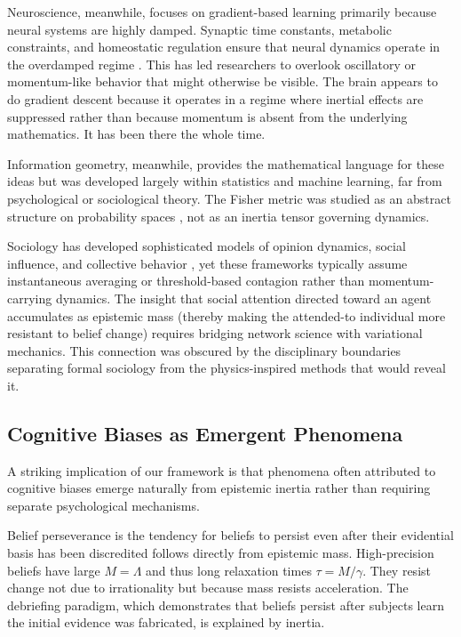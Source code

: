 \documentclass[12pt]{article}
\begin{document}
Neuroscience, meanwhile, focuses on gradient-based learning primarily because neural systems are highly damped. Synaptic time constants, metabolic constraints, and homeostatic regulation ensure that neural dynamics operate in the overdamped regime \citep{friston2008hierarchical} \citep{bogacz2017tutorial}. This has led researchers to overlook oscillatory or momentum-like behavior that might otherwise be visible. The brain appears to do gradient descent because it operates in a regime where inertial effects are suppressed rather than because momentum is absent from the underlying mathematics. It has been there the whole time.

Information geometry, meanwhile, provides the mathematical language for these ideas but was developed largely within statistics and machine learning, far from psychological or sociological theory. The Fisher metric was studied as an abstract structure on probability spaces \citep{Amari2016}, not as an inertia tensor governing dynamics.

 
Sociology has developed sophisticated models of opinion dynamics, social influence, and collective behavior \citep{degroot1974, friedkin2011, flache2017}, yet these frameworks typically assume instantaneous averaging or threshold-based contagion rather than momentum-carrying dynamics. The insight that social attention directed toward an agent accumulates as epistemic mass (thereby making the attended-to individual more resistant to belief change) requires bridging network science with variational mechanics. This connection was obscured by the disciplinary boundaries separating formal sociology from the physics-inspired methods that would reveal it.

\subsection{Cognitive Biases as Emergent Phenomena}

A striking implication of our framework is that phenomena often attributed to cognitive biases emerge naturally from epistemic inertia rather than requiring separate psychological mechanisms.

Belief perseverance is the tendency for beliefs to persist even after their evidential basis has been discredited \citep{anderson1980, ross1975} follows directly from epistemic mass. High-precision beliefs have large $M = \Lambda$ and thus long relaxation times $\tau = M/\gamma$. They resist change not due to irrationality but because mass resists acceleration. The debriefing paradigm, which demonstrates that beliefs persist after subjects learn the initial evidence was fabricated, is explained by inertia. 
\end{document}
